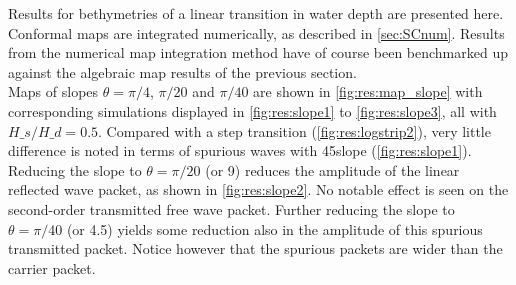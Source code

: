 %
%
%
%
%
%
%

Results for bethymetries of a linear transition in water depth are presented here.
Conformal maps are integrated numerically, as described in \autoref{sec:SCnum}.
Results from the numerical map integration method have of course been benchmarked up against the algebraic map results of the previous section.
\\

Maps of slopes $\theta=\pi/4$, $\pi/20$ and $\pi/40$ are shown in \autoref{fig:res:map_slope} with corresponding simulations displayed in \autoref{fig:res:slope1} to \ref{fig:res:slope3}, all with $H\_s/H\_d = 0.5$.
Compared with a step transition (\autoref{fig:res:logstrip2}), very little difference is noted in terms of spurious waves  with 45\textdegree slope (\autoref{fig:res:slope1}). 
Reducing the slope to $\theta=\pi/20$ (or 9\textdegree) reduces the amplitude of the linear reflected wave packet, as shown in \autoref{fig:res:slope2}. 
No notable effect is seen on the second-order transmitted free wave packet.
Further reducing the slope to $\theta=\pi/40$ (or 4.5\textdegree) yields some reduction also in the amplitude of this spurious transmitted packet.
Notice however that the spurious packets are wider than the carrier packet.



